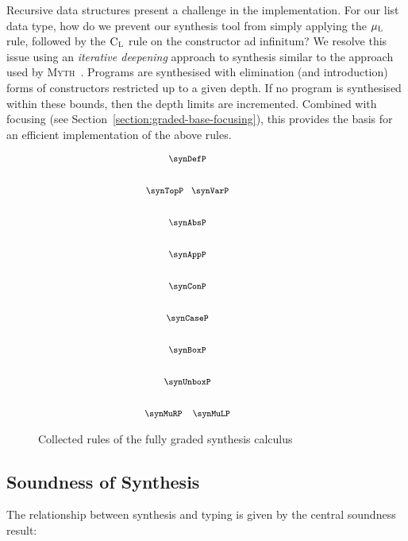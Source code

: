 Recursive data structures present a challenge in the implementation. For our
list data type, how do we prevent our synthesis tool from simply applying the
$\mu_\textsc{L}$ rule, followed by the $\textsc{C}_\textsc{L}$ rule on the
 constructor ad infinitum? We resolve this issue using an
\textit{iterative deepening} approach to synthesis similar to the approach used
by \textsc{Myth}~\citep{oserathesis}. Programs are synthesised with elimination
(and introduction) forms of constructors restricted up to a given depth. If no
program is synthesised within these bounds, then the depth limits are
incremented. Combined with focusing (see Section~\ref{section:graded-base-focusing}), this
provides the basis for an efficient implementation of the above rules.

\begin{figure}[H]
    \begin{align*}
      {\footnotesize{
    \hspace{-4em}\begin{array}{c}
      \synDefP
      \\[2.25em]
      \synTopP
      \;\;\;
      \synVarP
      \\[2.25em]
      \synAbsP
      \\[2.25em]
      \synAppP
      \\[2.25em]
      \synConP
      \\[2.25em]
      \synCaseP
      \\[2.25em]
      \synBoxP
      \\[2.25em]
      \synUnboxP
      \\[2.25em]
      \synMuRP
      \;\;\;\;
      \synMuLP
        \end{array}
      }}
      \end{align*}
    \caption{Collected rules of the fully graded synthesis calculus}
    \end{figure}


\subsection{Soundness of Synthesis}
\label{sec:graded-soundness}
The relationship between synthesis and typing is given by the central soundness
result: %

